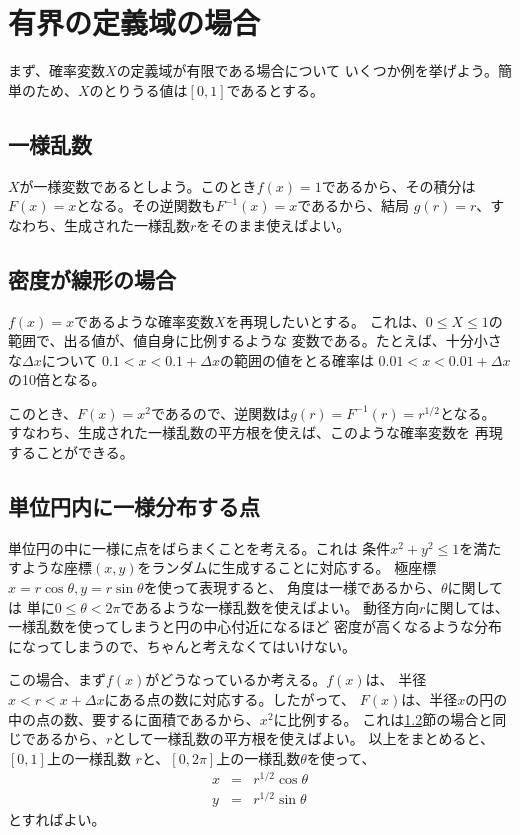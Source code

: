 \documentclass{jarticle}
\begin{document}
\section{有界の定義域の場合}

まず、確率変数$X$の定義域が有限である場合について
いくつか例を挙げよう。簡単のため、$X$のとりうる値は$[0,1]$であるとする。

\subsection{一様乱数}

$X$が一様変数であるとしよう。このとき$f(x)=1$であるから、その積分は
$F(x)=x$となる。その逆関数も$F^{-1}(x)=x$であるから、結局
$g(r)=r$、すなわち、生成された一様乱数$r$をそのまま使えばよい。

\subsection{密度が線形の場合}
\label{sec_linear}

$f(x)=x$であるような確率変数$X$を再現したいとする。
これは、$0 \le X \le 1$の範囲で、出る値が、値自身に比例するような
変数である。たとえば、十分小さな$\Delta x$について
$0.1 < x < 0.1 + \Delta x $の範囲の値をとる確率は
$0.01 < x < 0.01 + \Delta x $の10倍となる。

このとき、$F(x)=x^2$であるので、逆関数は$g(r) = F^{-1}(r) = r^{1/2}$となる。
すなわち、生成された一様乱数の平方根を使えば、このような確率変数を
再現することができる。

\subsection{単位円内に一様分布する点}

単位円の中に一様に点をばらまくことを考える。これは
条件$x^2+y^2 \le 1$を満たすような座標$(x,y)$をランダムに生成することに対応する。
極座標$x = r \cos \theta, y = r \sin \theta $を使って表現すると、
角度は一様であるから、$\theta$に関しては
単に$0 \le \theta < 2\pi$であるような一様乱数を使えばよい。
動径方向$r$に関しては、一様乱数を使ってしまうと円の中心付近になるほど
密度が高くなるような分布になってしまうので、ちゃんと考えなくてはいけない。

この場合、まず$f(x)$がどうなっているか考える。$f(x)$は、
半径$x < r < x + \Delta x$にある点の数に対応する。したがって、
$F(x)$は、半径$x$の円の中の点の数、要するに面積であるから、$x^2$に比例する。
これは\ref{sec_linear}節の場合と同じであるから、$r$として一様乱数の平方根を使えばよい。
以上をまとめると、$[0,1]$上の一様乱数 $r$と、$[0,2\pi]$上の一様乱数$\theta$を使って、
\begin{eqnarray}
x &=& r^{1/2} \cos \theta \\
y &=& r^{1/2} \sin \theta 
\end{eqnarray}
とすればよい。
\end{document}
